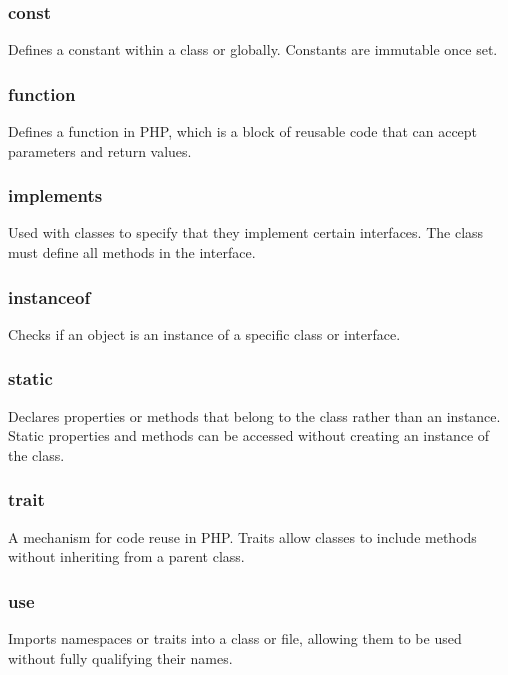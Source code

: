 \documentclass{report}
\begin{document}
\bigbreak \noindent 
\subsubsection{const}
\bigbreak \noindent 
Defines a constant within a class or globally. Constants are immutable once set.

\bigbreak \noindent 
\subsubsection{function}
\bigbreak \noindent 
Defines a function in PHP, which is a block of reusable code that can accept parameters and return values.

\bigbreak \noindent 
\subsubsection{implements}
\bigbreak \noindent 
Used with classes to specify that they implement certain interfaces. The class must define all methods in the interface.

\bigbreak \noindent 
\subsubsection{instanceof}
\bigbreak \noindent 
Checks if an object is an instance of a specific class or interface.

\bigbreak \noindent 
\subsubsection{static}
\bigbreak \noindent 
Declares properties or methods that belong to the class rather than an instance. Static properties and methods can be accessed without creating an instance of the class.

\bigbreak \noindent 
\subsubsection{trait}
\bigbreak \noindent 
A mechanism for code reuse in PHP. Traits allow classes to include methods without inheriting from a parent class.

\bigbreak \noindent 
\subsubsection{use}
\bigbreak \noindent 
Imports namespaces or traits into a class or file, allowing them to be used without fully qualifying their names.
\end{document}
